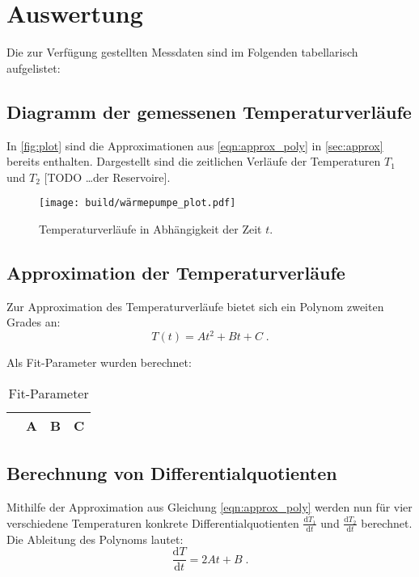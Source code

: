 \section{Auswertung} \label{sec:Auswertung}
Die zur Verfügung gestellten Messdaten sind im Folgenden tabellarisch aufgelistet:


\newpage
\subsection{Diagramm der gemessenen Temperaturverläufe} %
In \autoref{fig:plot} sind die Approximationen aus \autoref{eqn:approx_poly} in \autoref{sec:approx} bereits enthalten.
Dargestellt sind die zeitlichen Verläufe der Temperaturen $T_1$ und $T_2$ [TODO …der Reservoire].

\begin{figure}
  \centering
  \texttt{[image: build/wärmepumpe\_plot.pdf]}
  \caption{Temperaturverläufe in Abhängigkeit der Zeit $t$.}
  \label{fig:plot}
\end{figure}

\subsection{Approximation der Temperaturverläufe} \label{sec:approx} %
Zur Approximation des Temperaturverläufe bietet sich ein Polynom zweiten Grades an:
\begin{equation}
  \label{eqn:approx_poly}
  T(t) = At^2 + Bt + C \; .
\end{equation}

Als Fit-Parameter wurden berechnet:

\begin{table}
\centering
\caption{Fit-Parameter}
\label{tab:fit_params}
\begin{tabular}{c c c c}
\toprule
 & A & B & C \\
\midrule

\bottomrule
\end{tabular}
\end{table}

\subsection{Berechnung von Differentialquotienten} %
Mithilfe der Approximation aus Gleichung \autoref{eqn:approx_poly} werden nun für vier verschiedene Temperaturen konkrete Differentialquotienten $\frac{\mathrm{d}T_1}{\mathrm{d}t}$ und $\frac{\mathrm{d}T_2}{\mathrm{d}t}$ berechnet.
Die Ableitung des Polynoms lautet:
\[
\frac{\mathrm{d}T}{\mathrm{d}t} = 2At + B \; .
\]
\\

